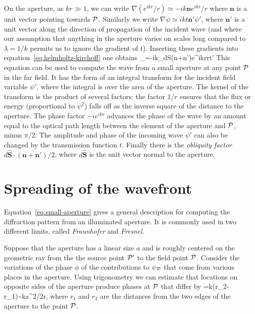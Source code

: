 On the aperture, as $kr\gg 1$, we can write $\nabla({e^{ikr}/r})\simeq -{ik{\bm n}e^{ikr}/r}$ 
where ${\bm n}$ is a unit vector pointing towards ${\cal P}$. Similarly we write 
$\nabla\psi\simeq ikt{\bm n'}\psi'$, where ${\bm n'}$ is a unit vector along the direction
of propagation of the incident wave (and where our assumption that anything in the aperture
varies on scales long compared to $\lambda={1/k}$ permits us to ignore the gradient of $t$).
Inserting these gradients into equation~\ref{eq:helmholtz-kirchoff} one obtains
\be
\psi_=-{ik\pi}\int_d{\bm S}\cdot\left({{\bm n}+{\bm n'}}\right){e^{ikr}\over r}t\psi'
\label{eq:small-aperture}
\ee
This equation can be used to compute the wave from a small aperture at any point ${\cal P}$ in 
the far field. It has the form of an integral transform for the incident field variable $\psi'$,
where the integral is over the area of the aperture. The kernel of the transform is the 
product of several factors: the factor ${1/r}$ ensures that the flux or energy (proportional
to $\psi^2$) falls off as the inverse square of the distance to the aperture. The phase 
factor $-ie^{ikr}$ advances the phase of the wave by an amount equal to the optical path 
length between the element of the aperture and ${\cal P}$, minus ${\pi/2}$. The amplitude and
phase of the incoming wave $\psi'$ can also be changed by the transmission function $t$.
Finally there is the {\it obliquity factor} ${d\hat{\bm S}\cdot({\bm n}+{\bm n'})/2}$, where 
$d\hat{\bm S}$ is the unit vector normal to the aperture. 

\section{Spreading of the wavefront}

Equation~\ref{eq:small-aperture} gives a general description for computing the diffraction 
pattern from an illuminated aperture. It is commonly used in two different limits, called
{\it Fraunhofer} and {\it Fresnel}.

Suppose that the aperture has a linear size $a$ and is roughly centered on the geometric ray
from the the source point ${\cal P}'$ to the field point ${\cal P}$. Consider the variations of 
the phase $\phi$ of the contributions to $\psi_{\cal P}$ that come from various places in the
aperture. Using trigonometry we can estimate that locations on opposite sides of the aperture
produce phases at ${\cal P}$ that differ by
\be
\Delta\phi=k(r_2-r_1)\sim {ka^2/2r},
\label{eq:exercise-3-eq}
\ee
where $r_1$ and $r_2$ are the distances from the two edges of the aperture to the point ${\cal P}$. 

